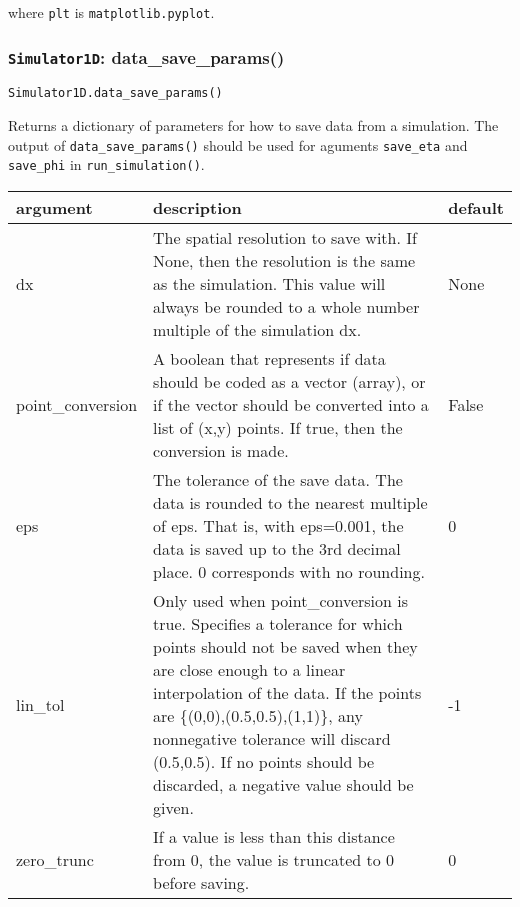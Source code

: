 \documentclass[10pt,a4paper]{article}
\newenvironment{optarglist}
    {\begin{center}
    \begin{tabular}{l|p{10cm}|l}
    argument & description & default\\
    \hline
    }
    { 
    \end{tabular} 
    \end{center}
    }
\begin{document}
where \texttt{plt} is \texttt{matplotlib.pyplot}.



\subsubsection{\texttt{Simulator1D}: data\_save\_params()}
\texttt{Simulator1D.data\_save\_params()}

Returns a dictionary of parameters for how to save data from a simulation. The output of \texttt{data\_save\_params()} should be used for aguments \texttt{save\_eta} and \texttt{save\_phi} in \texttt{run\_simulation()}.

\begin{optarglist}
        dx    
              & The spatial resolution to save with. If None, then the
                resolution is the same as the simulation. This value
                will always be rounded to a whole number multiple of
                the simulation dx. & None \\\hline

        point\_conversion
              & A boolean that represents if data should be coded as
                a vector (array), or if the vector should be converted
                into a list of (x,y) points. If true, then the conversion
                is made. & False \\\hline

        eps
              & The tolerance of the save data. The data is rounded to the 
                nearest multiple of eps. That is, with eps=0.001, the data
                is saved up to the 3rd decimal place. 0 corresponds with
                no rounding. & 0\\\hline
        
        lin\_tol
             & Only used when point\_conversion is true. Specifies a tolerance
                for which points should not be saved when they are close enough
                to a linear interpolation of the data. If the points are 
                \{(0,0),(0.5,0.5),(1,1)\}, any nonnegative tolerance will discard
                (0.5,0.5). If no points should be discarded, a negative value
                should be given. & -1\\\hline
        
        zero\_trunc
              & If a value is less than this distance from 0, the value is 
                truncated to 0 before saving.& 0
\end{optarglist}
\end{document}
